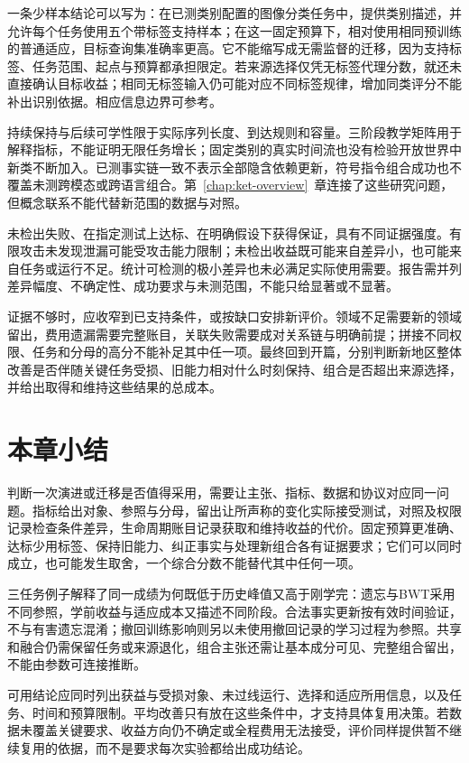 一条少样本结论可以写为：在已测类别配置的图像分类任务中，提供类别描述，并允许每个任务使用五个带标签支持样本；在这一固定预算下，相对使用相同预训练的普通适应，目标查询集准确率更高。它不能缩写成无需监督的迁移，因为支持标签、任务范围、起点与预算都承担限定。若来源选择仅凭无标签代理分数，就还未直接确认目标收益；相同无标签输入仍可能对应不同标签规律，增加同类评分不能补出识别依据。相应信息边界可参考。

持续保持与后续可学性限于实际序列长度、到达规则和容量。三阶段教学矩阵用于解释指标，不能证明无限任务增长；固定类别的真实时间流也没有检验开放世界中新类不断加入。已测事实链一致不表示全部隐含依赖更新，符号指令组合成功也不覆盖未测跨模态或跨语言组合。第~\ref{chap:ket-overview}~章连接了这些研究问题，但概念联系不能代替新范围的数据与对照。

未检出失败、在指定测试上达标、在明确假设下获得保证，具有不同证据强度。有限攻击未发现泄漏可能受攻击能力限制；未检出收益既可能来自差异小，也可能来自任务或运行不足。统计可检测的极小差异也未必满足实际使用需要。报告需并列差异幅度、不确定性、成功要求与未测范围，不能只给显著或不显著。

证据不够时，应收窄到已支持条件，或按缺口安排新评价。领域不足需要新的领域留出，费用遗漏需要完整账目，关联失败需要成对关系链与明确前提；拼接不同权限、任务和分母的高分不能补足其中任一项。最终回到开篇，分别判断新地区整体改善是否伴随关键任务受损、旧能力相对什么时刻保持、组合是否超出来源选择，并给出取得和维持这些结果的总成本。

\section{本章小结}
\label{sec:ket-evaluation-summary}

判断一次演进或迁移是否值得采用，需要让主张、指标、数据和协议对应同一问题。指标给出对象、参照与分母，留出让所声称的变化实际接受测试，对照及权限记录检查条件差异，生命周期账目记录获取和维持收益的代价。固定预算更准确、达标少用标签、保持旧能力、纠正事实与处理新组合各有证据要求；它们可以同时成立，也可能发生取舍，一个综合分数不能替代其中任何一项。

三任务例子解释了同一成绩为何既低于历史峰值又高于刚学完：遗忘与BWT采用不同参照，学前收益与适应成本又描述不同阶段。合法事实更新按有效时间验证，不与有害遗忘混淆；撤回训练影响则另以未使用撤回记录的学习过程为参照。共享和融合仍需保留任务或来源退化，组合主张还需让基本成分可见、完整组合留出，不能由参数可连接推断。

可用结论应同时列出获益与受损对象、未过线运行、选择和适应所用信息，以及任务、时间和预算限制。平均改善只有放在这些条件中，才支持具体复用决策。若数据未覆盖关键要求、收益方向仍不确定或全程费用无法接受，评价同样提供暂不继续复用的依据，而不是要求每次实验都给出成功结论。
